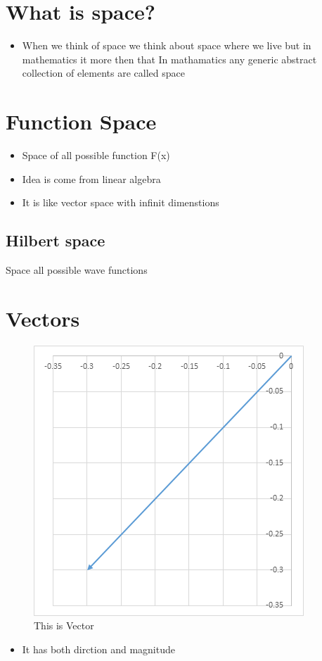 \documentclass[11pt]{article}
\author{Amalkrishnaur}
\date{\today}
\title{}
\begin{document}
\tableofcontents

\section{What is space?}
\label{sec:org0f0bbde}
\begin{itemize}
\item When we think of space we think about space where we live but in mathematics it more then that 
In mathamatics any generic abstract collection of elements are called space
\end{itemize}
\section{Function Space}
\label{sec:org429cc98}
\begin{itemize}
\item Space of all possible function F(x)
\item Idea is come from linear algebra
\item It is like vector space with infinit dimenstions
\end{itemize}
\subsection{Hilbert space}
\label{sec:org4c60f8c}
Space all possible wave functions
\section{Vectors}
\label{sec:org480e258}
\begin{figure}[htbp]
\centering
\includegraphics[width=.9\linewidth]{./2d-vector-grapher-8.png}
\caption{\label{fig:org66145ef}
This is Vector}
\end{figure}
\begin{itemize}
\item It has both dirction and magnitude
\end{itemize}
\end{document}
